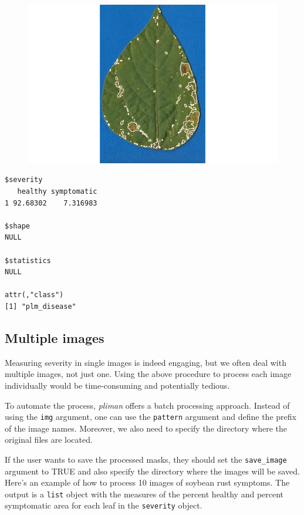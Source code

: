 \documentclass[
  letterpaper,
  DIV=11,
  numbers=noendperiod]{scrreprt}
\begin{document}
\begin{figure}[H]

{\centering \includegraphics{data-actual-severity_files/figure-pdf/unnamed-chunk-4-1.pdf}

}

\end{figure}

\begin{verbatim}
$severity
   healthy symptomatic
1 92.68302    7.316983

$shape
NULL

$statistics
NULL

attr(,"class")
[1] "plm_disease"
\end{verbatim}

\hypertarget{multiple-images}{%
\subsection{Multiple images}\label{multiple-images}}

Measuring severity in single images is indeed engaging, but we often
deal with multiple images, not just one. Using the above procedure to
process each image individually would be time-consuming and potentially
tedious.

To automate the process, \emph{pliman} offers a batch processing
approach. Instead of using the \texttt{img} argument, one can use the
\texttt{pattern} argument and define the prefix of the image names.
Moreover, we also need to specify the directory where the original files
are located.

If the user wants to save the processed masks, they should set the
\texttt{save\_image} argument to TRUE and also specify the directory
where the images will be saved. Here's an example of how to process 10
images of soybean rust symptoms. The output is a \texttt{list} object
with the measures of the percent healthy and percent symptomatic area
for each leaf in the \texttt{severity} object.
\end{document}
